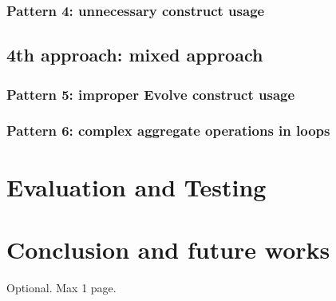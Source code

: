 \documentclass[12pt,a4paper,openright,twoside]{book}
\begin{document}
\subsection{Pattern 4: unnecessary construct usage}

\section{4th approach: mixed approach}

\subsection{Pattern 5: improper Evolve construct usage}

\subsection{Pattern 6: complex aggregate operations in loops}

\chapter{Evaluation and Testing}
\label{chap:evaluation}

\chapter{Conclusion and future works}
\label{chap:conclusion}


\backmatter

\nocite{*} %




\begin{acknowledgements} %
Optional. Max 1 page.
\end{acknowledgements}
\end{document}
